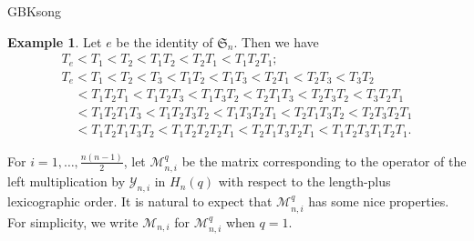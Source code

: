 \documentclass[13pt,a4paper, oneside]{amsart}       %
\numberwithin{equation}{section}
\theoremstyle{definition}
\newtheorem{example}[equation]{Example}
\theoremstyle{remark}
\begin{document}
\begin{CJK*}{GBK}{song}
\begin{example}Let $e$ be the identity of $\mathfrak{S}_n$.
Then we have
 \begin{eqnarray*}
  & T_{e}<T_1<T_2<T_1T_2<T_2T_1<T_1T_2T_1;&\\
   &T_{e}<T_1<T_2<T_3<T_1T_2<T_1T_3<T_2T_1<T_2T_3<T_3T_2&\\
  &\quad<T_1T_2T_1<T_1T_2T_3<T_1T_3T_2 <T_2T_1T_3<T_2T_3T_2<T_{3}T_2T_1&\\
  &\quad<T_{1}T_2T_1T_3<T_1T_2T_3T_2
  <T_1T_3T_2T_1<T_2T_1T_3T_2<T_2T_3T_2T_1&\\
&\quad< T_1T_2T_1T_3T_2<T_1T_2T_2T_2T_1
<T_2T_1T_3T_2T_1<T_1T_2T_3T_1T_2T_1.&
 \end{eqnarray*}
\end{example}

For $i=1,\ldots,\frac{n(n-1)}{2}$, let $\mathscr{M}^q_{n,i}$ be the matrix corresponding to the operator of the left multiplication by $\mathscr{Y}_{n,i}$ in $H_n(q)$ with respect to the length-plus lexicographic order. It is natural to expect that $\mathscr{M}^q_{n,i}$ has some nice properties. For simplicity, we write $\mathscr{M}_{n,i}$ for $\mathscr{M}^q_{n,i}$ when $q=1$.




\end{CJK*}
\end{document}
